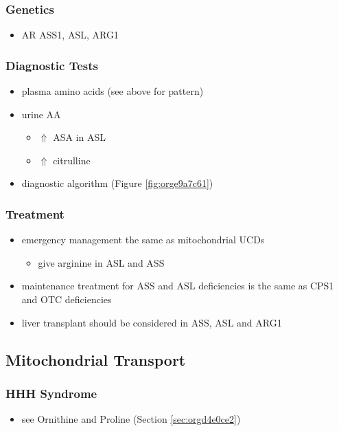 \documentclass[12pt]{scrartcl}
\begin{document}
\begin{center}
\begin{center}
\subsubsection{Genetics}
\label{sec:org9538280}
\begin{itemize}
\item AR ASS1, ASL, ARG1
\end{itemize}

\subsubsection{Diagnostic Tests}
\label{sec:org32eb260}
\begin{itemize}
\item plasma amino acids (see above for pattern)
\item urine AA
\begin{itemize}
\item \(\Uparrow\) ASA in ASL
\item \(\Uparrow\) citrulline
\end{itemize}
\item diagnostic algorithm (Figure \ref{fig:orge9a7c61})
\end{itemize}

\subsubsection{Treatment}
\label{sec:orgffe326f}
\begin{itemize}
\item emergency management the same as mitochondrial UCDs
\begin{itemize}
\item give arginine in ASL and ASS
\end{itemize}
\item maintenance treatment for ASS and ASL deficiencies is the same as
CPS1 and OTC deficiencies
\item liver transplant should be considered in ASS, ASL and ARG1
\end{itemize}

\subsection{Mitochondrial Transport}
\label{sec:orge262ac8}
\subsubsection{HHH Syndrome}
\label{sec:orga7bd76a}
\begin{itemize}
\item see Ornithine and Proline (Section \ref{sec:orgd4e0ce2})
\end{itemize}

\end{center}
\end{center}
\end{document}
